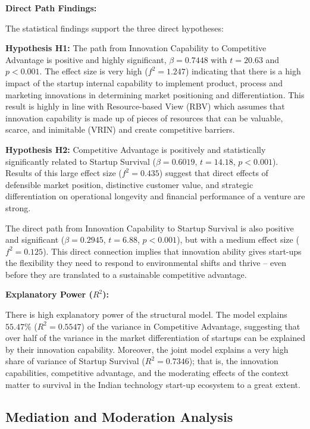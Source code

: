 \documentclass{ieeeaccess}
\begin{document}
\textbf{Direct Path Findings:}

The statistical findings support the three direct hypotheses:

\textbf{Hypothesis H1:}
The path from Innovation Capability to Competitive Advantage is positive and highly significant, $\beta = 0.7448$ with $t = 20.63$ and $p < 0.001$. The effect size is very high ($f^2 = 1.247$) indicating that there is a high impact of the startup internal capability to implement product, process and marketing innovations in determining market positioning and differentiation. This result is highly in line with Resource-based View (RBV) which assumes that innovation capability is made up of pieces of resources that can be valuable, scarce, and inimitable (VRIN) and create competitive barriers.

\textbf{Hypothesis H2:}
Competitive Advantage is positively and statistically significantly related to Startup Survival ($\beta = 0.6019$, $t = 14.18$, $p < 0.001$). Results of this large effect size ($f^2 = 0.435$) suggest that direct effects of defensible market position, distinctive customer value, and strategic differentiation on operational longevity and financial performance of a venture are strong.

The direct path from Innovation Capability to Startup Survival is also positive and significant ($\beta = 0.2945$, $t = 6.88$, $p < 0.001$), but with a medium effect size ($f^2 = 0.125$). This direct connection implies that innovation ability gives start-ups the flexibility they need to respond to environmental shifts and thrive -- even before they are translated to a sustainable competitive advantage.

\textbf{Explanatory Power ($R^2$):}

There is high explanatory power of the structural model. The model explains $55.47\%$ ($R^2 = 0.5547$) of the variance in Competitive Advantage, suggesting that over half of the variance in the market differentiation of startups can be explained by their innovation capability. Moreover, the joint model explains a very high share of variance of Startup Survival ($R^2 = 0.7346$); that is, the innovation capabilities, competitive advantage, and the moderating effects of the context matter to survival in the Indian technology start-up ecosystem to a great extent.


\subsection{Mediation and Moderation Analysis}
\end{document}
